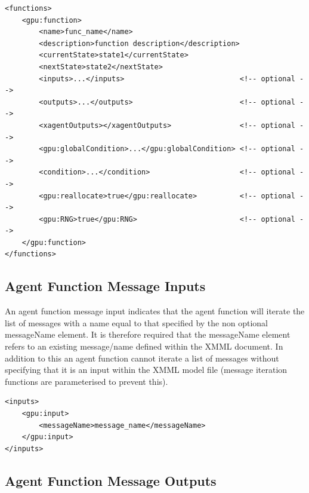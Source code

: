 \documentclass[11pt, a4paper, onecolumn, oneside]{report}
\begin{document}
\begin{verbatim}
<functions>
    <gpu:function>
        <name>func_name</name>
        <description>function description</description>
        <currentState>state1</currentState>
        <nextState>state2</nextState>
        <inputs>...</inputs>                           <!-- optional -->
        <outputs>...</outputs>                         <!-- optional -->
        <xagentOutputs></xagentOutputs>                <!-- optional -->
        <gpu:globalCondition>...</gpu:globalCondition> <!-- optional -->
        <condition>...</condition>                     <!-- optional -->
        <gpu:reallocate>true</gpu:reallocate>          <!-- optional -->
        <gpu:RNG>true</gpu:RNG>                        <!-- optional -->
    </gpu:function>
</functions>
\end{verbatim}


\subsection{Agent Function Message Inputs}
\label{sec:251}


An agent function message input indicates that the agent function will iterate the list of messages with a name equal to that specified by the non optional messageName element.
It is therefore required that the messageName element refers to an existing message/name defined within the XMML document.
In addition to this an agent function cannot iterate a list of messages without specifying that it is an input within the XMML model file (message iteration functions are parameterised to prevent this).

\begin{verbatim}
<inputs>
    <gpu:input>
        <messageName>message_name</messageName>
    </gpu:input>
</inputs>
\end{verbatim}

\subsection{Agent Function Message Outputs}
\label{sec:252}
\end{document}
